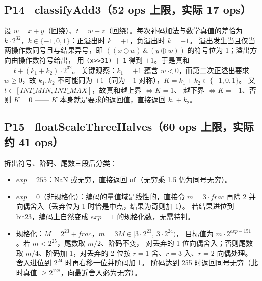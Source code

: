 \documentclass[11pt]{ctexart}
\begin{document}
\subsection{P14 \ classifyAdd3（52 ops 上限，实际 17 ops）}
设 $w = x + y$（回绕）、$t = w + z$（回绕）。每次补码加法与数学真值的差恰为
$k\cdot 2^{32}$，$k\in\{-1,0,1\}$：正溢出时 $k=+1$，负溢出时 $k=-1$。
溢出发生当且仅当两操作数同号且与结果异号，即
$((x\oplus w)\,\&\,(y\oplus w))$ 的符号位为 1；溢出方向由操作数符号给出，
用 \lstinline!(x>>31) | 1! 得到 $\pm 1$。于是真和 $= t + (k_1+k_2)\cdot 2^{32}$。
关键观察：$k_1 = +1$ 蕴含 $w<0$，而第二次正溢出要求 $w\ge 0$，故 $k_1,k_2$
不可能同为 $+1$（同为 $-1$ 对称），$K=k_1+k_2 \in \{-1,0,1\}$。
又 $t\in[\mathit{INT\_MIN},\mathit{INT\_MAX}]$，故真和越上界 $\iff K=1$、
越下界 $\iff K=-1$、否则 $K=0$ —— $K$ 本身就是要求的返回值，直接返回 $k_1+k_2$。

\subsection{P15 \ floatScaleThreeHalves（60 ops 上限，实际约 41 ops）}
拆出符号、阶码、尾数三段后分类：
\begin{itemize}
  \item $\mathit{exp}=255$：NaN 或无穷，直接返回 \texttt{uf}（无穷乘 1.5 仍为同号无穷）。
  \item $\mathit{exp}=0$（非规格化）：编码的量值域是线性的，直接令 $m=3\cdot
    \mathit{frac}$ 再除 2 并向偶舍入（丢弃位为 1 时恰是中点，结果为奇则加 1）。
    若结果进位到 bit23，编码上自然变成 $\mathit{exp}=1$ 的规格化数，无需特判。
  \item 规格化：$M = 2^{23}+\mathit{frac}$，$m = 3M \in [3\cdot 2^{23},\, 3\cdot 2^{24})$，
    目标值为 $m\cdot 2^{\mathit{exp}-151}$。若 $m < 2^{25}$，尾数取 $m/2$、阶码不变，
    对丢弃的 1 位向偶舍入；否则尾数取 $m/4$、阶码加 1，对丢弃的 2 位按
    $r=1$ 舍、$r=3$ 入、$r=2$ 向偶处理。舍入进位到 $2^{24}$ 时再右移一位并阶码加 1。
    阶码达到 255 时返回同号无穷（此时真值 $\ge 2^{128}$，向最近舍入必为无穷）。
\end{itemize}
\end{document}
